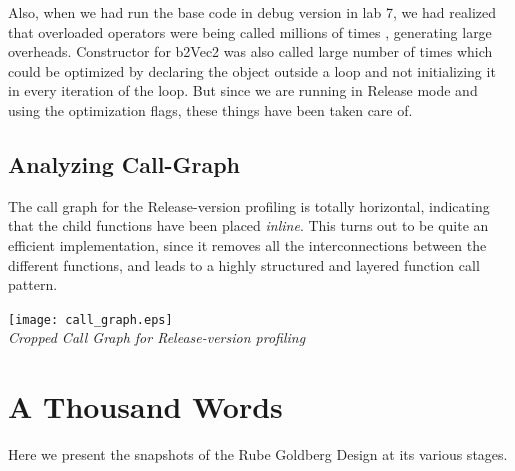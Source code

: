 \documentclass[a4paper,11pt]{article}
\begin{document}
Also, when we had run the base code in debug version in lab 7, we had realized that overloaded operators were being called millions of times , generating large overheads. Constructor for b2Vec2 was also called large number of times which could be optimized by declaring the object outside a loop and not initializing it in every iteration of the loop. But since we are running in Release mode and using the optimization flags, these things have been taken care of. 

\subsection{Analyzing Call-Graph}

The call graph for the Release-version profiling is totally horizontal, indicating that the child functions have been placed \emph{inline}.  This turns out to be quite an efficient implementation, since it removes all the interconnections between the different functions, and leads to a highly structured and layered function call pattern.

\begin{center}
\texttt{[image: call\_graph.eps]}\\
\emph{Cropped Call Graph for Release-version profiling}
\end{center}


\section{A Thousand Words}

Here we present the snapshots of the Rube Goldberg Design at its various stages.
\end{document}

